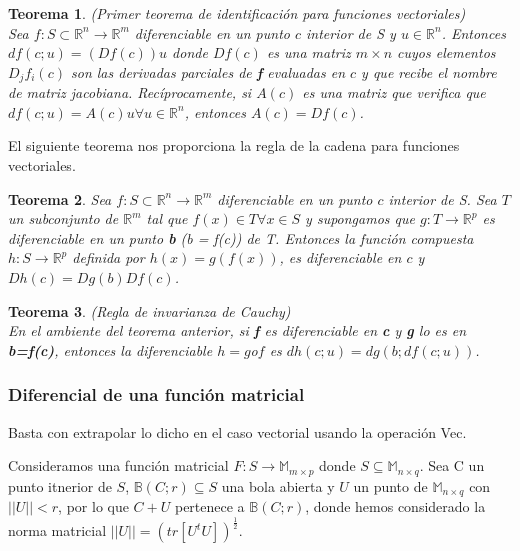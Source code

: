 \documentclass{article}
\theoremstyle{theorem-style}  %
\newtheorem{theorem}{Teorema}[section]  %
\theoremstyle{definition-style}
\theoremstyle{example-style}
\theoremstyle{exercise-style}
\begin{document}
	\begin{theorem} (Primer teorema de identificación para funciones vectoriales)\\
		Sea $f: S\subset \mathbb{R}^n \rightarrow \mathbb{R}^m$ diferenciable en un punto $c$ interior de S y $u  \in \mathbb{R}^n$. Entonces $df(c;u)=(Df(c))u$ donde $Df(c)$ es una matriz $m \times n$ cuyos elementos $D_jf_i(c)$ son las derivadas parciales de \textbf{f} evaluadas en $c$ y que recibe el nombre de matriz jacobiana. Recíprocamente, si $A(c)$ es una matriz que verifica que $df(c;u)=A(c)u \forall u\in \mathbb{R}^n$, entonces $A(c) = Df(c)$. 
	\end{theorem}
	
	El siguiente teorema nos proporciona la regla de la cadena para funciones vectoriales.
	
	\begin{theorem}
		Sea $f: S\subset \mathbb{R}^n \rightarrow \mathbb{R}^m$ diferenciable en un punto $c$ interior de S. Sea $T$ un subconjunto de $\mathbb{R}^m$ tal que $f(x) \in T \forall x \in S$ y supongamos que $g: T \rightarrow \mathbb{R}^p$ es diferenciable en un punto \textbf{b} (b = f(c)) de T. Entonces la función compuesta $h: S \rightarrow \mathbb{R}^p$ definida por $h(x)=g(f(x))$, es diferenciable en $c$ y $Dh(c)=Dg(b)Df(c)$.
	\end{theorem}
	
	\begin{theorem} (Regla de invarianza de Cauchy) \\
		En el ambiente del teorema anterior, si \textbf{f} es diferenciable en \textbf{c} y \textbf{g} lo es en \textbf{b=f(c)}, entonces la diferenciable $h=g$o$f$ es $dh(c;u) = dg(b;df(c;u))$.   
		
	\end{theorem}
	
	\subsubsection{Diferencial de una función matricial}
	
	Basta con extrapolar lo dicho en el caso vectorial usando la operación Vec.
	
	Consideramos una función matricial $F: S \rightarrow \mathbb{M}_{m\times p}$ donde $S \subseteq \mathbb{M}_{n\times q}$. Sea C un punto itnerior de $S$, $\mathbb{B}(C;r) \subseteq S$ una bola abierta y $U$ un punto de $\mathbb{M}_{n\times q}$ con $||U||<r$, por lo que $C+U$ pertenece a $\mathbb{B}(C;r)$, donde hemos considerado la norma matricial $||U||=(tr[U^tU])^{\frac{1}{2}}$.
	
\end{document}
